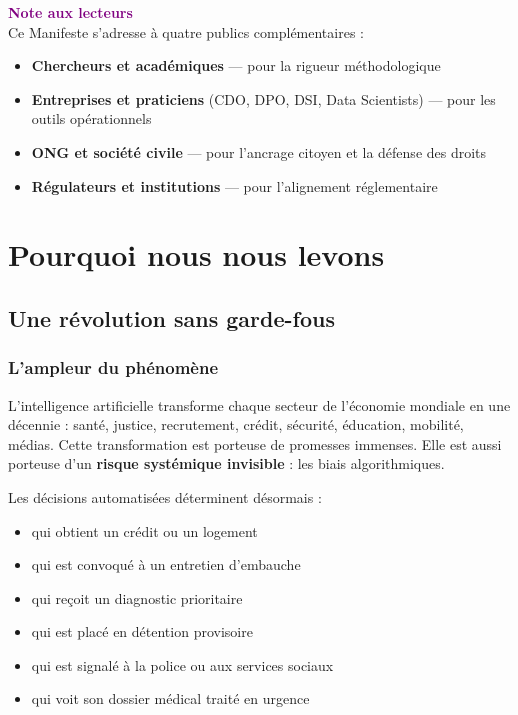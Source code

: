 \documentclass[11pt,a4paper,openany]{book}
\begin{document}
\vspace{0.5cm}

\begin{quoteauthor}
\textbf{\textcolor{purple}{Note aux lecteurs}}\\[4pt]
Ce Manifeste s'adresse à quatre publics complémentaires :
\begin{itemize}[leftmargin=1.5em, topsep=2pt, itemsep=1pt]
  \item \textbf{Chercheurs et académiques} — pour la rigueur méthodologique
  \item \textbf{Entreprises et praticiens} (CDO, DPO, DSI, Data Scientists) — pour les outils opérationnels
  \item \textbf{ONG et société civile} — pour l'ancrage citoyen et la défense des droits
  \item \textbf{Régulateurs et institutions} — pour l'alignement réglementaire
\end{itemize}
\end{quoteauthor}

\clearpage

\mainmatter
\part{Pourquoi nous nous levons}
\label{part:pourquoi}

\chapter{Une révolution sans garde-fous}

\section{L'ampleur du phénomène}

L'intelligence artificielle transforme chaque secteur de l'économie mondiale en une décennie : santé, justice, recrutement, crédit, sécurité, éducation, mobilité, médias. Cette transformation est porteuse de promesses immenses. Elle est aussi porteuse d'un \textbf{risque systémique invisible} : les biais algorithmiques.

Les décisions automatisées déterminent désormais :
\begin{itemize}[leftmargin=1.5em]
  \item qui obtient un crédit ou un logement
  \item qui est convoqué à un entretien d'embauche
  \item qui reçoit un diagnostic prioritaire
  \item qui est placé en détention provisoire
  \item qui est signalé à la police ou aux services sociaux
  \item qui voit son dossier médical traité en urgence
\end{itemize}
\end{document}
